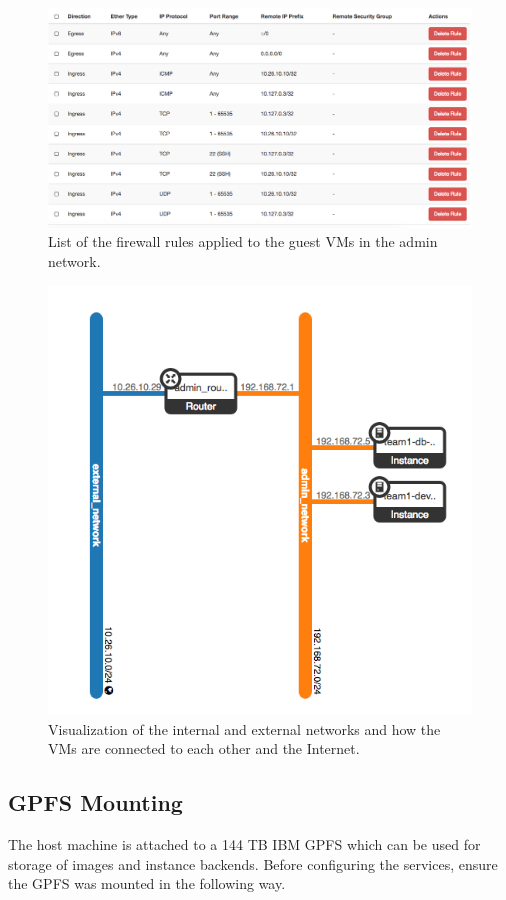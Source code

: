 \begin{figure}[H]
  \centering
  \includegraphics[scale=0.40]{img/network-fw}
  \caption{List of the firewall rules applied to the guest VMs in the
admin network.}
  \label{fig:fw}
\end{figure}

\begin{figure}[H]
  \centering
  \includegraphics[scale=0.5]{img/network-topo}
  \caption{Visualization of the internal and external networks and how
the VMs are connected to each other and the Internet.}
  \label{fig:topo}
\end{figure}


\subsection{GPFS Mounting}
\label{gpfs-config}
The host machine is attached to a 144 TB IBM GPFS which can be used for
storage of images and instance backends. Before configuring the
services, ensure the GPFS was mounted in the following way.


